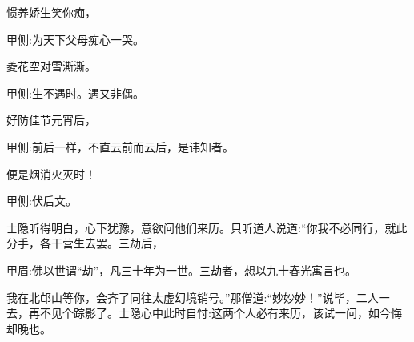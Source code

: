 \begin{poem}
    \begin{pl}惯养娇生笑你痴，\end{pl}\begin{note}甲侧:为天下父母痴心一哭。\end{note}

    \begin{pl}菱花空对雪澌澌。\end{pl}\begin{note}甲侧:生不遇时。遇又非偶。\end{note}

    \begin{pl}好防佳节元宵后，\end{pl}\begin{note}甲侧:前后一样，不直云前而云后，是讳知者。\end{note}

    \begin{pl}便是烟消火灭时！\end{pl}\begin{note}甲侧:伏后文。\end{note}
\end{poem}


\begin{parag}
    士隐听得明白，心下犹豫，意欲问他们来历。只听道人说道:“你我不必同行，就此分手，各干营生去罢。三劫后，\begin{note}甲眉:佛以世谓“劫”，凡三十年为一世。三劫者，想以九十春光寓言也。\end{note}我在北邙山等你，会齐了同往太虚幻境销号。”那僧道:“妙妙妙！”说毕，二人一去，再不见个踪影了。士隐心中此时自忖:这两个人必有来历，该试一问，如今悔却晚也。
\end{parag}


